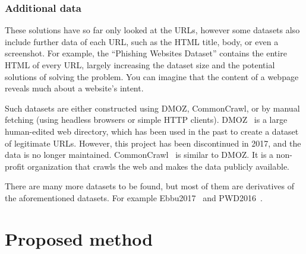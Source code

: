 \documentclass{article}
\begin{document}
    \subsubsection{Additional data}\label{subsec:additional-data}
    These solutions have so far only looked at the URLs, however some datasets also include further data of each URL, such as the HTML title, body, or even a screenshot.
    For example, the ``Phishing Websites Dataset''\cite{VisualizingRNNInURLDetection} contains the entire HTML of every URL, largely increasing the dataset size and the potential solutions of solving the problem.
    You can imagine that the content of a webpage reveals much about a website's intent.

    Such datasets are either constructed using DMOZ, CommonCrawl, or by manual fetching (using headless browsers\cite{PhishingLoginURLDetection} or simple HTTP clients).%
    DMOZ~\cite{DMOZ} is a large human-edited web directory, which has been used in the past to create a dataset of legitimate URLs. However, this project has been discontinued in 2017, and the data is no longer maintained.
    CommonCrawl~\cite{CommonCrawl} is similar to DMOZ. It is a non-profit organization that crawls the web and makes the data publicly available.

    There are many more datasets to be found, but most of them are derivatives of the aforementioned datasets.
    For example Ebbu2017~\cite{EBBU2017} and PWD2016~\cite{PWD2016}.

%
%
%


    \section{Proposed method}\label{sec:proposed-method}
\end{document}
